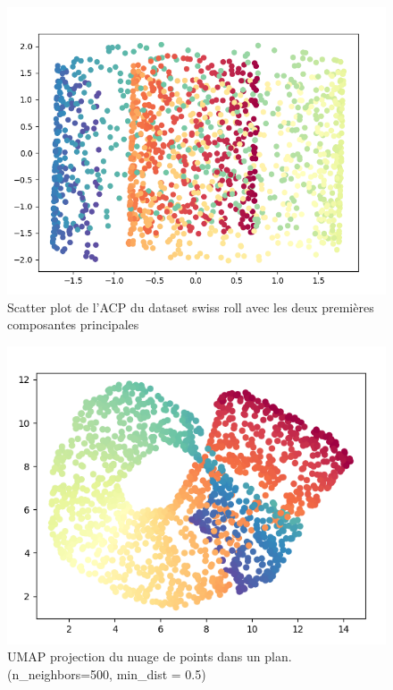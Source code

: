 \documentclass{beamer}
\theoremstyle{definition}
\begin{document}
\begin{frame}
	\begin{minipage}[c]{1\linewidth}
		\begin{minipage}[t]{0.4\linewidth}\centering\begin{figure}
				\centering
				\includegraphics[scale=0.25]{acp_swiss_roll.png}
				\caption{Scatter plot de l'ACP du dataset swiss roll avec les deux premières composantes principales}
		\end{figure}\end{minipage}\hfill 
		\begin{minipage}[t]{0.43\linewidth}\centering\begin{figure}
				\begin{center}
					\includegraphics[scale=0.27]{umap2_swiss_roll.png}			
					\caption{UMAP projection du nuage de points dans un plan.\\ 
					(n\_neighbors=500, min\_dist = 0.5) }
				\end{center}
				
		\end{figure}\end{minipage}
	\end{minipage}
	
	
\end{frame}
\end{document}
